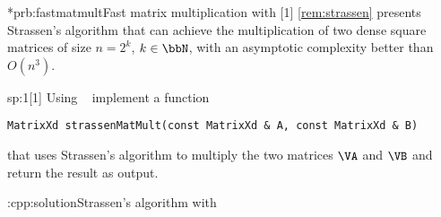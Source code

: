 \begin{samproblem}*{prb:fastmatmult}{Fast matrix multiplication with \eigen{}}[1]{
\cref{rem:strassen} presents Strassen's algorithm that can achieve
  the multiplication of two dense square matrices of size {$n=2^{k}$},
  $k\in\bbN$, with an asymptotic complexity better than $O(n^{3})$.
}

\begin{subproblem}{sp:1}[1]
	Using \eigen~ implement a function
	\begin{lstlisting}[style=cppsimple]
	 MatrixXd strassenMatMult(const MatrixXd & A, const MatrixXd & B)
	\end{lstlisting}
	that uses Strassen's algorithm to multiply the two matrices $\VA$ and
	$\VB$ and return the result as output. 

  \begin{samsolution}
    \begin{samcode}[C++-code]{\cpl:cpp:solution}{Strassen's algorithm with \eigen{}}
    \end{samcode}
  \end{samsolution}

\end{subproblem}

\end{samproblem}
